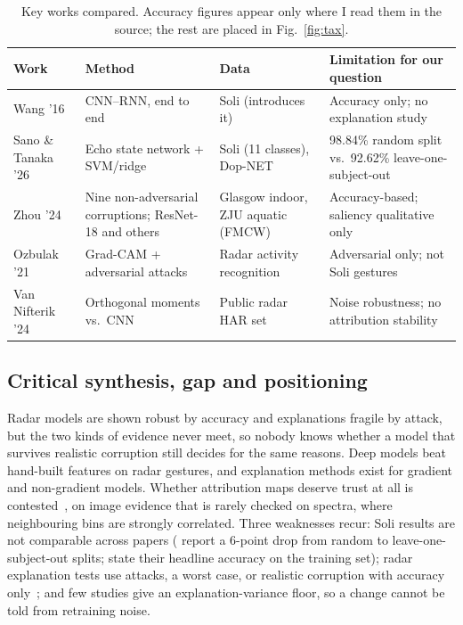 \documentclass[11pt]{article}
\begin{document}
\begin{table}[!tb]
\centering
\footnotesize
\setlength{\tabcolsep}{3pt}
\begin{tabular}{@{}L{2.9cm}L{4.0cm}L{3.2cm}L{5.0cm}@{}}
\toprule
\textbf{Work} & \textbf{Method} & \textbf{Data} & \textbf{Limitation for our question} \\
\midrule
Wang '16 \citep{wang2016soli} & CNN--RNN, end to end & Soli (introduces it) & Accuracy only; no explanation study \\
Sano \& Tanaka '26 \citep{sano2026esn} & Echo state network + SVM/ridge & Soli (11 classes), Dop-NET & 98.84\% random split vs.\ 92.62\% leave-one-subject-out \\
Zhou '24 \citep{zhou2024corruption} & Nine non-adversarial corruptions; ResNet-18 and others & Glasgow indoor, ZJU aquatic (FMCW) & Accuracy-based; saliency qualitative only \\
Ozbulak '21 \citep{ozbulak2021radaradversarial} & Grad-CAM + adversarial attacks & Radar activity recognition & Adversarial only; not Soli gestures \\
Van Nifterik '24 \citep{vannifterik2024moments} & Orthogonal moments vs.\ CNN & Public radar HAR set & Noise robustness; no attribution stability \\
\bottomrule
\end{tabular}
\caption{Key works compared. Accuracy figures appear only where I read them in the source; the rest are placed in Fig.~\ref{fig:tax}.}
\label{tab:cmp}
\end{table}

\subsection{Critical synthesis, gap and positioning}
Radar models are shown robust by accuracy and explanations fragile by attack, but the two kinds of evidence never meet, so nobody knows whether a model that survives realistic corruption still decides for the same reasons. Deep models beat hand-built features on radar gestures, and explanation methods exist for gradient and non-gradient models. Whether attribution maps deserve trust at all is contested~\citep{adebayo2018sanity,ghorbani2019fragile,yeh2019infidelity}, on image evidence that is rarely checked on spectra, where neighbouring bins are strongly correlated. Three weaknesses recur: Soli results are not comparable across papers (\citet{sano2026esn} report a 6-point drop from random to leave-one-subject-out splits; \citet{zhang2022resnetlstm} state their headline accuracy on the training set); radar explanation tests use attacks, a worst case, or realistic corruption with accuracy only~\citep{zhou2024corruption}; and few studies give an explanation-variance floor, so a change cannot be told from retraining noise.
\end{document}
